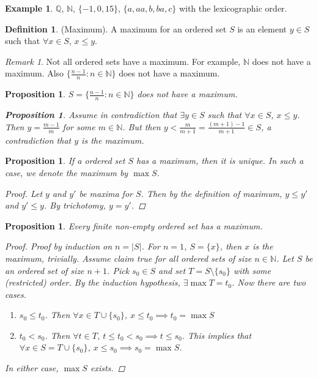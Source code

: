 \documentclass[10pt]{article}
\newcommand{\N}{\mathbb{N}}
\newcommand{\Q}{\mathbb{Q}}
\newcommand{\abs}[1]{\left| #1 \right|}
\newtheorem{proposition}[theorem]{Proposition}
\theoremstyle{definition}
\newtheorem{definition}[theorem]{Definition}
\newtheorem{example}[theorem]{Example}
\theoremstyle{remark}
\newtheorem*{remark}{Remark}
\begin{document}
\begin{example}
    $\Q$, $\N$, $\{-1, 0, 15\}$, $\{a, aa, b, ba, c\}$ with the lexicographic order.
\end{example}

\begin{definition}
    (Maximum).
    A maximum for an ordered set $S$ is an element $y \in S$ such that $\forall x \in S$, $x \leq y$.
\end{definition}

\begin{remark}
    Not all ordered sets have a maximum. For example, $\N$ does not have a maximum. Also
    $\{\frac{n-1}{n} \colon n \in \N\}$ does not have a maximum.
\end{remark}

\begin{proposition}
    $S = \{\frac{n-1}{n} \colon n \in \N\}$ does not have a maximum.
    \begin{proposition}
        Assume in contradiction that $\exists y \in S$ such that $\forall x \in S$, $x \leq y$.
        Then $y = \frac{m-1}{m}$ for some $m \in \N$.
        But then $y < \frac{m}{m + 1} = \frac{(m+1) - 1}{m+1} \in S$, a contradiction that $y$ is the maximum.
    \end{proposition}
\end{proposition}

\begin{proposition}
    If a ordered set $S$ has a maximum, then it is unique. In such a case, we denote the maximum by $\max S$.
    \begin{proof}
        Let $y$ and $y'$ be maxima for $S$. Then by the definition of maximum, $y   \leq y'$ and $y' \leq y$.
        By trichotomy, $y = y'$.
    \end{proof}
\end{proposition}

\begin{proposition}
    Every finite non-empty ordered set has a maximum.

    \begin{proof}
        Proof by induction on $n = \abs{S}$. For $n = 1$, $S = \{x\}$, then $x$ is the maximum, trivially.
        Assume claim true for all ordered sets of size $n \in \N$. Let $S$ be an ordered set of size $n + 1$.
        Pick $s_0 \in S$ and set $T = S \setminus \{s_0\}$ with some (restricted) order.
        By the induction hypothesis, $\exists \max T = t_0$. Now there are two cases.
        \begin{enumerate}
            \item $s_0 \leq t_0$. Then $\forall x \in T \cup \{s_0\}$, $x \leq t_0 \implies t_0 = \max S$
            \item $t_0 < s_0$. Then $\forall t\in T$, $t \leq t_0 < s_0 \implies t \leq s_0$.
                This implies that $\forall x \in S = T \cup \{s_0\}$, $x \leq s_0 \implies s_0 = \max S$.
        \end{enumerate}
        In either case, $\max S$ exists.
    \end{proof}
\end{proposition}
\end{document}
